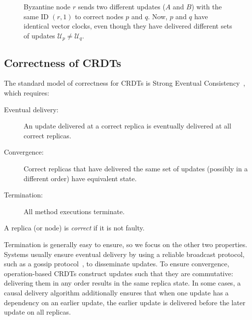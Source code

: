 \documentclass[sigplan,review]{acmart}
\begin{document}
\begin{figure*}
\centering
{}
\caption{Byzantine node $r$ sends two different updates ($A$ and $B$) with the same ID $(r,1)$ to correct nodes $p$ and $q$. Now, $p$ and $q$ have identical vector clocks, even though they have delivered different sets of updates $\mathcal{U}_p \ne \mathcal{U}_q$.}
\label{fig:vectorclocks}
\end{figure*}

\subsection{Correctness of CRDTs}\label{sec:sec}

The standard model of correctness for CRDTs is Strong Eventual Consistency~\cite{Shapiro:2011,Gomes:2017gy}, which requires:
\begin{description}
\item[Eventual delivery:] An update delivered at a correct replica is eventually delivered at all correct replicas.
\item[Convergence:] Correct replicas that have delivered the same set of updates (possibly in a different order) have equivalent state.
\item[Termination:] All method executions terminate.
\end{description}
A replica (or node) is \emph{correct} if it is not faulty.

Termination is generally easy to ensure, so we focus on the other two properties.
Systems usually ensure eventual delivery by using a reliable broadcast protocol, such as a gossip protocol~\cite{Leitao:2009fi}, to disseminate updates.
To ensure convergence, operation-based CRDTs construct updates such that they are commutative: delivering them in any order results in the same replica state.
In some cases, a causal delivery algorithm additionally ensures that when one update has a dependency on an earlier update, the earlier update is delivered before the later update on all replicas.
\end{document}
